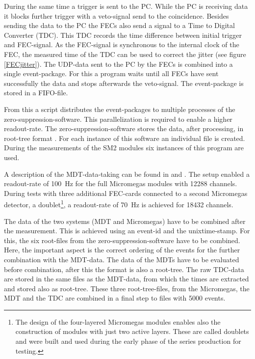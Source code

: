 \documentclass[
twoside,            %
BCOR1.4cm,          %
10pt,               %
headings=normal,    %
headsepline,        %
clearplainpage,		%
final,              %
div=14,
open=right,
bibliography=toc
]{scrreprt}
\begin{document}
During the same time a trigger is sent to the PC. 
While the PC is receiving data it blocks further trigger with a veto-signal send to the coincidence.
Besides sending the data to the PC the FECs also send a signal to a Time to Digital Converter (TDC).
This TDC records the time difference between initial trigger and FEC-signal.
As the FEC-signal is synchronous to the internal clock of the FEC, the measured time of the TDC can be used to correct the jitter (see figure \ref{FECjitter}).
The UDP-data sent to the PC by the FECs is combined into a single event-package.
For this a program waits until all FECs have sent successfully the data and stops afterwards the veto-signal.
The event-package is stored in a FIFO-file.

From this a script distributes the event-packages to multiple processes of the zero-suppression-software.
This parallelization is required to enable a higher readout-rate.
The zero-suppression-software stores the data, after processing, in root-tree format \cite{root}.
For each instance of this software an individual file is created.
During the measurements of the SM2 modules six instances of this program are used.

A description of the MDT-data-taking can be found in \cite{CRF} and \cite{rauscherThesis}.
The setup enabled a readout-rate of \SI{100}{Hz} for the full Micromegas modules with 12288 channels.
During tests with three additional FEC-cards connected to a second Micromegas detector, a doublet\footnote{
	The design of the four-layered Micromegas modules enables also the construction of modules with just two active layers.
	These are called doublets and were built and used during the early phase of the series production for testing.
}, a readout-rate of \SI{70}{Hz} is achieved for 18432 channels.

The data of the two systems (MDT and Micromegas) have to be combined after the measurement.
This is achieved using an event-id and the unixtime-stamp.
For this, the six root-files from the zero-suppression-software have to be combined.
Here, the important aspect is the correct ordering of the events for the further combination with the MDT-data.
The data of the MDTs have to be evaluated before combination, after this the format is also a root-tree.
The raw TDC-data are stored in the same files as the MDT-data, from which the times are extracted and stored also as root-tree.
These three root-tree-files, from the Micromegas, the MDT and the TDC are combined in a final step to files with 5000 events.
\end{document}
